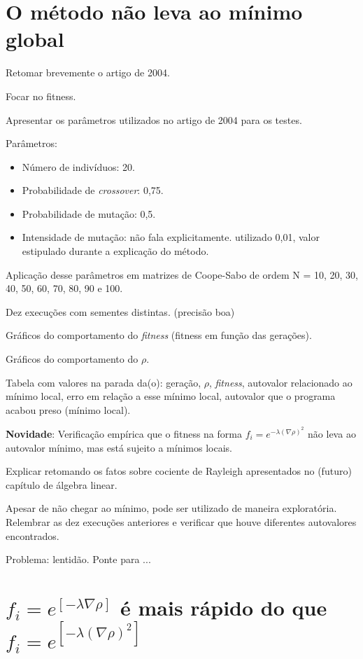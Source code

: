 \section{O método não leva ao mínimo global}	

	Retomar brevemente o artigo de 2004. 
	
	Focar no fitness.
	
	Apresentar os parâmetros utilizados no artigo de 2004 \cite{metodo2004} para os testes.
	
	Parâmetros:
	
	\begin{itemize}
		\item Número de indivíduos: 20.
		\item Probabilidade de \textit{crossover}: 0,75.
		\item Probabilidade de mutação: 0,5.
		\item Intensidade de mutação: não fala explicitamente. utilizado 0,01, valor estipulado durante a explicação do método.
		
	\end{itemize}
	
	Aplicação desse parâmetros em matrizes de Coope-Sabo de ordem	N = 10, 20, 30, 40, 50, 60, 70, 80, 90 e 100.
	
	Dez execuções com sementes distintas. (precisão boa)
	
	Gráficos do comportamento do \textit{fitness} (fitness em função das gerações).
	
	Gráficos do comportamento do $\rho$.
	
	Tabela com valores na parada da(o): geração, $\rho$, \textit{fitness}, autovalor relacionado ao mínimo local, erro em relação a esse mínimo local, autovalor que o programa acabou preso (mínimo local).
	
	\textbf{\textcolor[rgb]{1,0,0}{Novidade}}: Verificação empírica que o fitness na forma $f_i = e^{-\lambda(\nabla\rho)^2}$ não leva ao autovalor mínimo, mas está sujeito a mínimos locais.
	
	Explicar retomando os fatos sobre cociente de Rayleigh apresentados no (futuro) capítulo de álgebra linear.
	
	Apesar de não chegar ao mínimo, pode ser utilizado de maneira exploratória. Relembrar as dez execuções anteriores e verificar que houve diferentes autovalores encontrados.
	
	Problema: lentidão. Ponte para ...
	
	\section{$f_i = e^{[-\lambda \nabla \rho]}$ é mais rápido do que $f_i = e^{[-\lambda (\nabla \rho)^2]}$}
	
